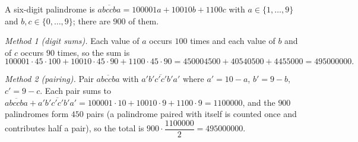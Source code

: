 A six-digit palindrome is $\overline{abccba}=100001a+10010b+1100c$ with $a\in\{1,\dots,9\}$ and $b,c\in\{0,\dots,9\}$; there are $900$ of them.

\emph{Method 1 (digit sums).} Each value of $a$ occurs $100$ times and each value of $b$ and of $c$ occurs $90$ times, so the sum is
\[100001\cdot45\cdot100+10010\cdot45\cdot90+1100\cdot45\cdot90=450004500+40540500+4455000=\boxed{495000000}.\]

\emph{Method 2 (pairing).} Pair $\overline{abccba}$ with $\overline{a'b'c'c'b'a'}$ where $a'=10-a$, $b'=9-b$, $c'=9-c$. Each pair sums to $\overline{abccba}+\overline{a'b'c'c'b'a'}=100001\cdot10+10010\cdot9+1100\cdot9=1100000$, and the $900$ palindromes form $450$ pairs (a palindrome paired with itself is counted once and contributes half a pair), so the total is $900\cdot\dfrac{1100000}{2}=495000000$.
